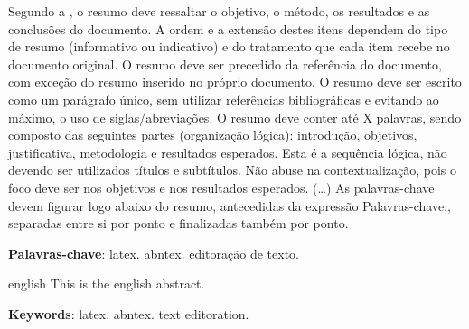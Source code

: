 \documentclass[
	12pt,				%
	oneside,			%
	a4paper,			%
	chapter=TITLE,		%
	english,			%
	brazil				%
	]{abntex2}
\begin{document}
\setlength{\absparsep}{18pt} %
\begin{resumo}
 Segundo a , o resumo deve ressaltar o
 objetivo, o método, os resultados e as conclusões do documento. A ordem e a extensão
 destes itens dependem do tipo de resumo (informativo ou indicativo) e do
 tratamento que cada item recebe no documento original. O resumo deve ser
 precedido da referência do documento, com exceção do resumo inserido no
 próprio documento. O resumo deve ser escrito como um parágrafo único, sem utilizar referências bibliográficas e evitando ao máximo, o uso de siglas/abreviações. O resumo deve conter até X palavras, sendo composto das seguintes partes (organização lógica): introdução, objetivos, justificativa, metodologia e resultados esperados. Esta é a sequência lógica, não devendo ser utilizados títulos e subtítulos. Não abuse na contextualização, pois o foco deve ser nos objetivos e nos resultados esperados. (\ldots) As palavras-chave devem figurar logo abaixo do
 resumo, antecedidas da expressão Palavras-chave:, separadas entre si por
 ponto e finalizadas também por ponto.

 \textbf{Palavras-chave}: latex. abntex. editoração de texto.
\end{resumo}

\begin{resumo}[Abstract]
 \begin{otherlanguage*}{english}
   This is the english abstract.

   \vspace{\onelineskip}
 
   \noindent 
   \textbf{Keywords}: latex. abntex. text editoration.
 \end{otherlanguage*}
\end{resumo}


\listoffigures*
\cleardoublepage
\listoftables*
\cleardoublepage

\begin{KeepFromToc}
\lstlistoflistings
\end{KeepFromToc}
\cleardoublepage
\end{document}
